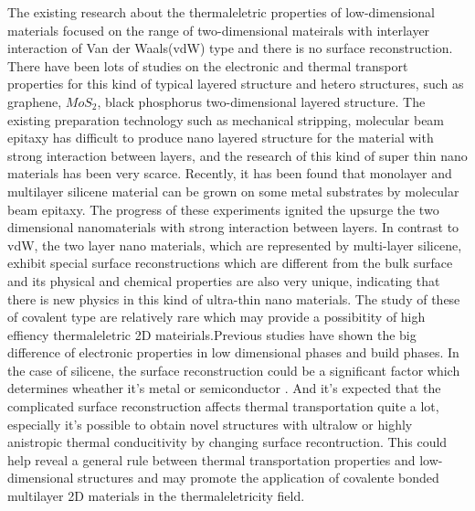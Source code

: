 \documentclass[%
 reprint,
 amsmath,amssymb,
 aps,
 prb,
]{revtex4-1}
\begin{document}
The existing research about the thermaleletric properties of low-dimensional materials focused on the range of  two-dimensional mateirals with interlayer interaction of  Van der Waals(vdW) type and there is no surface reconstruction. There have been lots of studies on the electronic and thermal transport properties for this kind of typical layered structure and hetero structures, such as graphene\cite{Lindsay2011,Ni2012,Wang2011}, $MoS_2$\cite{Liu2015}, black phosphorus\cite{Zhang2015,Peng2015,Jain2015} two-dimensional layered structure. The existing preparation technology such as mechanical stripping, molecular beam epitaxy has difficult to produce nano layered structure for the material with strong interaction between layers, and the research of this kind of super thin nano materials has been very scarce. Recently, it has been found that monolayer and multilayer silicene material can be grown on some metal substrates by molecular beam epitaxy\cite{Fleurence2012,Meng2013,Vogt2012,DePadova2013,Feng2012}. The progress of these experiments ignited the upsurge the two dimensional nanomaterials with strong interaction between layers. In contrast to vdW, the two layer nano materials, which are represented by multi-layer silicene, exhibit special surface reconstructions which are different from the bulk surface\cite{Fleurence2012,Meng2013,Feng2012,Guo2013} and its physical and chemical properties are also very unique\cite{Guo2013,Guo2015}, indicating that there is new physics in this kind of ultra-thin nano materials. The study of these of covalent type are relatively rare which may provide a possibitity of high effiency thermaleletric 2D mateirials.Previous studies have shown the big difference of electronic properties in low dimensional phases and build phases. In the case of silicene, the surface reconstruction could be a significant factor which determines wheather it's metal or semiconductor \cite{Guo2015Structural}. And it's expected that the complicated surface reconstruction affects thermal transportation quite a lot, especially it's possible to obtain novel structures with ultralow or highly anistropic thermal conducitivity by changing surface recontruction. This could help reveal a general rule between thermal transportation properties and low-dimensional structures and may promote the application of covalente bonded multilayer 2D materials in the thermaleletricity field.
\end{document}
